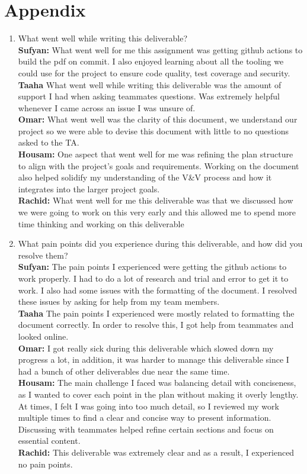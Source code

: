 \documentclass[12pt, titlepage]{article}
\begin{document}
\newpage{}
\section*{Appendix}



\begin{enumerate}
  \item What went well while writing this deliverable? \\
  \textbf{Sufyan:} What went well for me this assignment was getting github actions to build the pdf on commit. I also enjoyed learning about all the tooling we could use for the project to ensure code quality, test coverage and security. \\
  \textbf{Taaha} What went well while writing this deliverable was the amount of support I had when asking teammates questions. Was extremely helpful whenever I came across an issue I was unsure of. \\
  \textbf{Omar:} What went well was the clarity of this document, we understand our project so we were able to devise this document with little to no questions asked to the TA. \\
  \textbf{Housam:} One aspect that went well for me was refining the plan structure to align with the project’s goals and requirements. Working on the document also helped solidify my understanding of the V\&V process and how it integrates into the larger project goals. \\
  \textbf{Rachid:} What went well for me this deliverable was that we discussed how we were going to work on this very early and this allowed me to spend more time thinking and working on this deliverable

  \item What pain points did you experience during this deliverable, and how
    did you resolve them? \\
  \textbf{Sufyan:} The pain points I experienced were getting the github actions to work properly. I had to do a lot of research and trial and error to get it to work. I also had some issues with the formatting of the document. I resolved these issues by asking for help from my team members. \\
  \textbf{Taaha} The pain points I experienced were mostly related to formatting the document correctly. In order to resolve this, I got help from teammates and looked online. \\
  \textbf{Omar:} I got really sick during this deliverable which slowed down my progress a lot, in addition, it was harder to manage this deliverable since I had a bunch of other deliverables due near the same time. \\
  \textbf{Housam:} The main challenge I faced was balancing detail with conciseness, as I wanted to cover each point in the plan without making it overly lengthy. At times, I felt I was going into too much detail, so I reviewed my work multiple times to find a clear and concise way to present information. Discussing with teammates helped refine certain sections and focus on essential content. \\
  \textbf{Rachid:} This deliverable was extremely clear and as a result, I experienced no pain points.


\end{enumerate}
\end{document}

